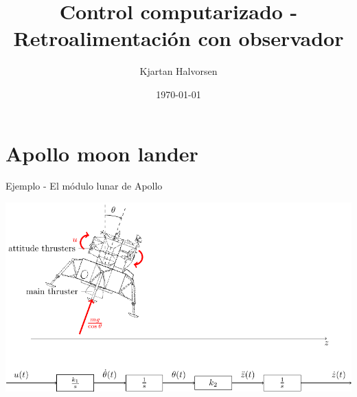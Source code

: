\documentclass[presentation,aspectratio=1610]{beamer}
\author{Kjartan Halvorsen}
\date{\today}
\title{Control computarizado - Retroalimentación con observador}
\begin{document}
\maketitle

\section{Apollo moon lander}
\label{sec:org5671638}
\begin{frame}[label={sec:orge1a9d61}]{Ejemplo - El módulo lunar de Apollo}
\begin{center}
\includegraphics[width=\linewidth]{fig-apollo}
\end{center}
\end{frame}
\end{document}
